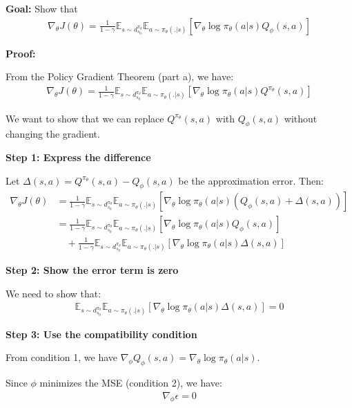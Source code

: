 \textbf{Goal:} Show that
\begin{align}
\nabla_\theta J(\theta) = \frac{1}{1-\gamma}\mathbb{E}_{s \sim d^{\pi_\theta}_{s_0}}\mathbb{E}_{a \sim \pi_\theta(.|s)} [\nabla_\theta \log \pi_\theta (a|s) Q_\phi (s, a)]
\end{align}

\textbf{Proof:}

From the Policy Gradient Theorem (part a), we have:
\begin{align}
\nabla_\theta J(\theta) = \frac{1}{1-\gamma}\mathbb{E}_{s \sim d^{\pi_\theta}_{s_0}}\mathbb{E}_{a \sim \pi_\theta(.|s)} [\nabla_\theta \log \pi_\theta (a|s) Q^{\pi_\theta} (s, a)]
\end{align}

We want to show that we can replace $Q^{\pi_\theta}(s,a)$ with $Q_\phi(s,a)$ without changing the gradient.

\textbf{Step 1: Express the difference}

Let $\Delta(s,a) = Q^{\pi_\theta}(s,a) - Q_\phi(s,a)$ be the approximation error. Then:
\begin{align}
\nabla_\theta J(\theta) &= \frac{1}{1-\gamma}\mathbb{E}_{s \sim d^{\pi_\theta}_{s_0}}\mathbb{E}_{a \sim \pi_\theta(.|s)} [\nabla_\theta \log \pi_\theta (a|s) (Q_\phi(s,a) + \Delta(s,a))] \\
&= \frac{1}{1-\gamma}\mathbb{E}_{s \sim d^{\pi_\theta}_{s_0}}\mathbb{E}_{a \sim \pi_\theta(.|s)} [\nabla_\theta \log \pi_\theta (a|s) Q_\phi(s,a)] \\
&\quad + \frac{1}{1-\gamma}\mathbb{E}_{s \sim d^{\pi_\theta}_{s_0}}\mathbb{E}_{a \sim \pi_\theta(.|s)} [\nabla_\theta \log \pi_\theta (a|s) \Delta(s,a)]
\end{align}

\textbf{Step 2: Show the error term is zero}

We need to show that:
\begin{align}
\mathbb{E}_{s \sim d^{\pi_\theta}_{s_0}}\mathbb{E}_{a \sim \pi_\theta(.|s)} [\nabla_\theta \log \pi_\theta (a|s) \Delta(s,a)] = 0
\end{align}

\textbf{Step 3: Use the compatibility condition}

From condition 1, we have $\nabla_{\phi} Q_\phi(s, a) = \nabla_\theta \log \pi_\theta (a|s)$.

Since $\phi$ minimizes the MSE (condition 2), we have:
\begin{align}
\nabla_\phi \epsilon = 0
\end{align}

